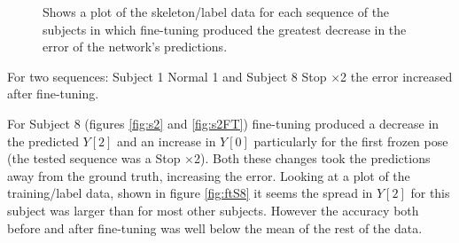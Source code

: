 \documentclass[11pt]{article} %
\begin{document}
\begin{figure}
\centering
{}%
\qquad%
%
\caption{Shows a plot of the skeleton/label data for each sequence of the subjects in which fine-tuning produced the greatest decrease in the error of the network's predictions. }
\end{figure}

For two sequences: Subject 1 Normal 1 and Subject 8 Stop $\times$2 the error increased after fine-tuning.

For Subject 8 (figures \ref{fig:s2} and \ref{fig:s2FT}) fine-tuning produced a decrease in the predicted $Y[2]$ and an increase in $Y[0]$ particularly for the first frozen pose (the tested sequence was a Stop $\times$2). Both these changes took the predictions away from the ground truth, increasing the error. Looking at a plot of the training/label data, shown in figure \ref{fig:ftS8} it seems the spread in $Y[2]$ for this subject was larger than for most other subjects. However the accuracy both before and after fine-tuning was well below the mean of the rest of the data.
\end{document}
